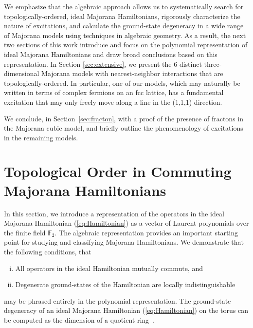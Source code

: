 \documentclass[aps,twocolumn,preprintnumbers,floatfix,showpacs,prx]{revtex4-1}
\begin{document}
We emphasize that the algebraic approach 
allows us to systematically search for topologically-ordered, ideal Majorana Hamiltonians,
rigorously characterize the nature of excitations,
and calculate the ground-state degeneracy in a wide range of Majorana models using techniques in algebraic geometry.
As a result, the next two sections of this work introduce and focus on
the polynomial representation of ideal Majorana Hamiltonians 
and draw broad conclusions based on this representation.
In Section \ref{sec:extensive},
we present the 6 distinct three-dimensional Majorana models with %
nearest-neighbor interactions that are topologically-ordered.  In particular, one of our models, which may naturally be written in terms of complex fermions on an fcc lattice, has a fundamental excitation that may only freely move along a line in the (1,1,1) direction.  

We conclude, in Section~\ref{sec:fracton}, with a proof of the presence of fractons in the Majorana cubic model,
and briefly outline the phenomenology of excitations in the remaining models.  %


\section{Topological Order in Commuting Majorana Hamiltonians}
\label{sec:algebraic}

In this section, we introduce a representation of the operators in the ideal Majorana Hamiltonian (\ref{eq:Hamiltonian})
as a vector of Laurent polynomials over the finite field $\mathbb{F}_{2}$.
The algebraic representation provides an important starting point for studying and classifying Majorana Hamiltonians.
We demonstrate that the following conditions, that
\begin{enumerate}[(i)]
\item All operators in the ideal Hamiltonian mutually commute, and
\item Degenerate ground-states of the Hamiltonian are locally indistinguishable
\end{enumerate}
may be phrased entirely in the polynomial representation.
The ground-state degeneracy of an ideal Majorana Hamiltonian (\ref{eq:Hamiltonian})
on the torus can be computed as the dimension of a quotient ring~\cite{Haah_Commuting_Pauli}.  
\end{document}
